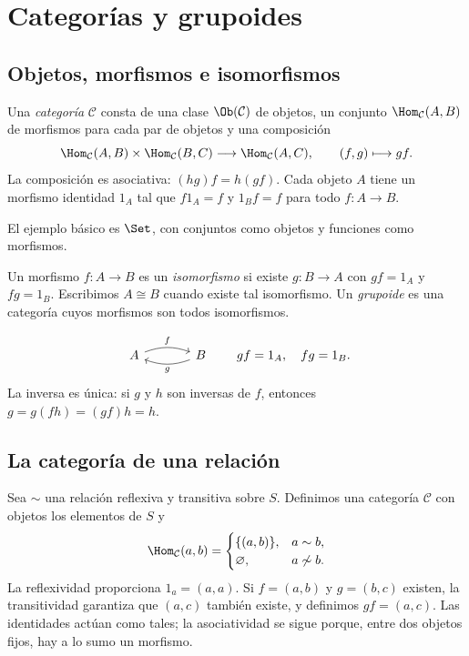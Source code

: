 \section{Categorías y grupoides}
\subsection{Objetos, morfismos e isomorfismos}
\begin{defi}
Una \emph{categoría} $\mathcal C$ consta de una clase $\Ob(\mathcal C)$ de objetos, un conjunto $\Hom_{\mathcal C}(A,B)$ de morfismos para cada par de objetos y una composición
\[
\Hom_{\mathcal C}(A,B)\times\Hom_{\mathcal C}(B,C)
\longrightarrow\Hom_{\mathcal C}(A,C),\qquad(f,g)\longmapsto gf.
\]
La composición es asociativa: $(hg)f=h(gf)$. Cada objeto $A$ tiene un morfismo identidad $1_A$ tal que $f1_A=f$ y $1_Bf=f$ para todo $f:A\to B$.
\end{defi}
El ejemplo básico es $\Set$, con conjuntos como objetos y funciones como morfismos.

\begin{defi}
Un morfismo $f:A\to B$ es un \emph{isomorfismo} si existe $g:B\to A$ con $gf=1_A$ y $fg=1_B$. Escribimos $A\cong B$ cuando existe tal isomorfismo. Un \emph{grupoide} es una categoría cuyos morfismos son todos isomorfismos.
\end{defi}
\[
\begin{tikzcd}[column sep=large]
A\arrow[r,bend left=20,"f"]&B\arrow[l,bend left=20,"g"]
\end{tikzcd}
\qquad gf=1_A,\quad fg=1_B.
\]
La inversa es única: si $g$ y $h$ son inversas de $f$, entonces $g=g(fh)=(gf)h=h$.

\subsection{La categoría de una relación}
Sea $\sim$ una relación reflexiva y transitiva sobre $S$. Definimos una categoría $\mathcal C$ con objetos los elementos de $S$ y
\[
\Hom_{\mathcal C}(a,b)=
\begin{cases}\{(a,b)\},&a\sim b,\\\varnothing,&a\not\sim b.\end{cases}
\]
La reflexividad proporciona $1_a=(a,a)$. Si $f=(a,b)$ y $g=(b,c)$ existen, la transitividad garantiza que $(a,c)$ también existe, y definimos $gf=(a,c)$. Las identidades actúan como tales; la asociatividad se sigue porque, entre dos objetos fijos, hay a lo sumo un morfismo.

